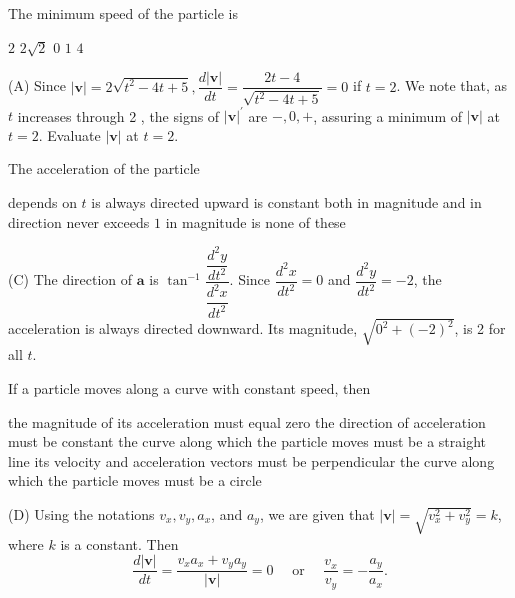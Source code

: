 \question
The minimum speed of the particle is
\begin{choices}
  \CorrectChoice $2$
  \choice $2 \sqrt{2}$
  \choice $0$
  \choice $1$
  \choice $4$
\end{choices}
\begin{solution}
(A) Since $|\mathbf{v}|=2 \sqrt{t^{2}-4 t+5}, \dfrac{d|\mathbf{v}|}{d t}=\dfrac{2 t-4}{\sqrt{t^{2}-4 t+5}}=0$ if $t=2$. We note that, as $t$ increases through 2 , the signs of $|\mathbf{v}|^{\prime}$ are $-, 0,+$, assuring a minimum of $|\mathbf{v}|$ at $t=2$. Evaluate $|\mathbf{v}|$ at $t=2$.
\end{solution}





\newpage




\question\label{calc04:plane-last}
The acceleration of the particle
\begin{choices}
  \choice depends on $t$
  \choice is always directed upward
  \CorrectChoice is constant both in magnitude and in direction
  \choice never exceeds $1$ in magnitude
  \choice is none of these
\end{choices}
\begin{solution}
(C) The direction of $\mathbf{a}$ is $\tan ^{-1} \dfrac{\dfrac{d^{2} y}{d t^{2}}}{\dfrac{d^{2} x}{d t^{2}}}$. Since $\dfrac{d^{2} x}{d t^{2}}=0$ and $\dfrac{d^{2} y}{d t^{2}}=-2$, the acceleration is always directed downward. Its magnitude, $\sqrt{0^{2}+(-2)^{2}}$, is 2 for all $t$.
\end{solution}

\question
If a particle moves along a curve with constant speed, then
\begin{choices}
  \choice the magnitude of its acceleration must equal zero
  \choice the direction of acceleration must be constant
  \choice the curve along which the particle moves must be a straight line
  \CorrectChoice its velocity and acceleration vectors must be perpendicular
  \choice the curve along which the particle moves must be a circle
\end{choices}
\begin{solution}
(D) Using the notations $v_{x}, v_{y}, a_{x}$, and $a_{y}$, we are given that $|\mathbf{v}|=\sqrt{v_{x}^{2}+v_{y}^{2}}=k$, where $k$ is a constant. Then
\[
\dfrac{d|\mathbf{v}|}{d t}=\dfrac{v_{x} a_{x}+v_{y} a_{y}}{|\mathbf{v}|}=0 \quad \text { or } \quad \dfrac{v_{x}}{v_{y}}=-\dfrac{a_{y}}{a_{x}} .
\]
\end{solution}

